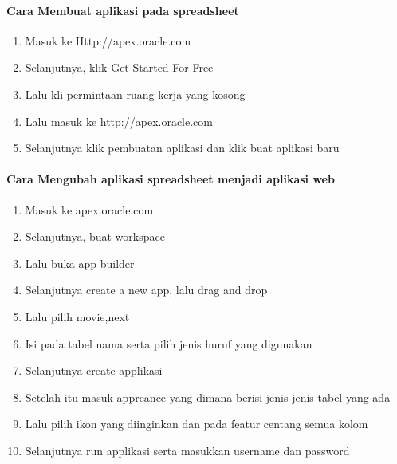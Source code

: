 \documentclass[a4paper,12pt]{report}
\begin{document}
\paragraph{Cara Membuat aplikasi pada spreadsheet}
\begin{enumerate}
\item Masuk ke Http://apex.oracle.com
\item Selanjutnya, klik Get Started For Free
\item Lalu kli permintaan ruang kerja yang kosong
\item Lalu masuk ke http://apex.oracle.com
\item Selanjutnya klik pembuatan aplikasi dan klik buat aplikasi baru
\end{enumerate}
\paragraph{Cara Mengubah aplikasi spreadsheet menjadi aplikasi web}
\begin{enumerate}
\item Masuk ke apex.oracle.com
\item Selanjutnya, buat workspace
\item Lalu buka app builder
\item Selanjutnya create a new app, lalu drag and drop
\item Lalu pilih movie,next
\item Isi pada tabel nama serta pilih jenis huruf yang digunakan
\item Selanjutnya create applikasi
\item Setelah itu masuk appreance yang dimana berisi jenis-jenis tabel yang ada
\item Lalu pilih ikon yang diinginkan dan pada featur centang semua kolom
\item  Selanjutnya run applikasi serta masukkan username dan password
\end{enumerate}
\end{document}
